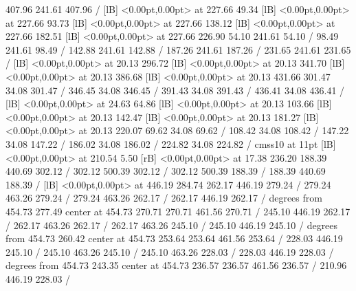 {\setsolid
{} 407.96 241.61 407.96 /
  [lB] <0.00pt,0.00pt> at 227.66 49.34
  [lB] <0.00pt,0.00pt> at 227.66 93.73
  [lB] <0.00pt,0.00pt> at 227.66 138.12
  [lB] <0.00pt,0.00pt> at 227.66 182.51
  [lB] <0.00pt,0.00pt> at 227.66 226.90
\setsolid
{} 54.10 241.61 54.10 /
\setsolid
{} 98.49 241.61 98.49 /
\setsolid
{} 142.88 241.61 142.88 /
\setsolid
{} 187.26 241.61 187.26 /
\setsolid
{} 231.65 241.61 231.65 /
  [lB] <0.00pt,0.00pt> at 20.13 296.72
  [lB] <0.00pt,0.00pt> at 20.13 341.70
  [lB] <0.00pt,0.00pt> at 20.13 386.68
  [lB] <0.00pt,0.00pt> at 20.13 431.66
\setsolid
{} 301.47 34.08 301.47 /
\setsolid
{} 346.45 34.08 346.45 /
\setsolid
{} 391.43 34.08 391.43 /
\setsolid
{} 436.41 34.08 436.41 /
  [lB] <0.00pt,0.00pt> at 24.63 64.86
  [lB] <0.00pt,0.00pt> at 20.13 103.66
  [lB] <0.00pt,0.00pt> at 20.13 142.47
  [lB] <0.00pt,0.00pt> at 20.13 181.27
  [lB] <0.00pt,0.00pt> at 20.13 220.07
\setsolid
{} 69.62 34.08 69.62 /
\setsolid
{} 108.42 34.08 108.42 /
\setsolid
{} 147.22 34.08 147.22 /
\setsolid
{} 186.02 34.08 186.02 /
\setsolid
{} 224.82 34.08 224.82 /
\font\picfont cmss10 at 11pt\picfont
{}  [lB] <0.00pt,0.00pt> at 210.54 5.50
 [rB] <0.00pt,0.00pt> at 17.38 236.20
\setsolid
{} 188.39 440.69 302.12 /
 302.12 500.39 302.12 /
 302.12 500.39 188.39 /
 188.39 440.69 188.39 /
  [lB] <0.00pt,0.00pt> at 446.19 284.74
\setsolid
{} 262.17 446.19 279.24 /
 279.24 463.26 279.24 /
 279.24 463.26 262.17 /
 262.17 446.19 262.17 /
 degrees from 454.73 277.49 center at 454.73 270.71
\setdashpattern <4pt, 4pt>
 270.71 461.56 270.71 /
\setsolid
{} 245.10 446.19 262.17 /
 262.17 463.26 262.17 /
 262.17 463.26 245.10 /
 245.10 446.19 245.10 /
 degrees from 454.73 260.42 center at 454.73 253.64
\setdashpattern <4pt, 4pt>
 253.64 461.56 253.64 /
\setsolid
{} 228.03 446.19 245.10 /
 245.10 463.26 245.10 /
 245.10 463.26 228.03 /
 228.03 446.19 228.03 /
 degrees from 454.73 243.35 center at 454.73 236.57
\setdashpattern <4pt, 4pt>
 236.57 461.56 236.57 /
\setsolid
{} 210.96 446.19 228.03 /
}
